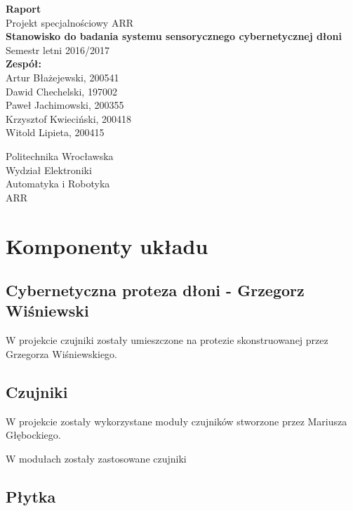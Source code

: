 \documentclass[a4paper,12pt]{article}
\begin{document}
\begin{titlepage}
\begin{center}
\vspace*{1cm}
{ \Large \textbf{ Raport }}\\[1cm]


{ \Large Projekt specjalnościowy ARR \\
\textbf{Stanowisko do badania systemu sensorycznego cybernetycznej dłoni}}\\
Semestr letni 2016/2017\\[2cm]

\Large{
\textbf{Zespół:}}\\
\large {Artur Błażejewski, 200541\\
Dawid Chechelski, 197002\\
Paweł Jachimowski, 200355\\
Krzysztof Kwieciński, 200418\\
Witold Lipieta, 200415}

\vfill
\Large
Politechnika Wrocławska\\
\large
Wydział Elektroniki\\
Automatyka i Robotyka\\
ARR
\end{center}
\end{titlepage}


	\section{Komponenty układu}
		\subsection{Cybernetyczna proteza dłoni - Grzegorz Wiśniewski}
			W projekcie czujniki zostały umieszczone na protezie skonstruowanej przez Grzegorza Wiśniewskiego. \cite{Reka}
		\subsection{Czujniki}
			W projekcie zostały wykorzystane moduły czujników stworzone przez Mariusza Głębockiego. \cite{Moduly}
			
			W modułach zostały zastosowane czujniki \cite{MPL112A2}
			
		\subsection{Płytka}
			
\end{document}

